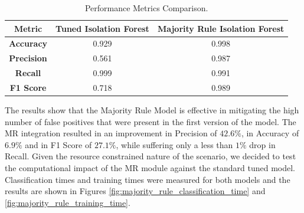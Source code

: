\documentclass[futureinternet,article,submit,pdftex,moreauthors]{Definitions/mdpi}
\begin{document}
\begin{table}[H]
    \caption{Performance Metrics Comparison.}\label{tab:majority_rule_performanceMetrics}
    \begin{tabularx}{\textwidth}{CCC}
    \toprule
    \textbf{Metric} & \textbf{Tuned Isolation Forest} & \textbf{Majority Rule Isolation Forest} \\
    \midrule
    \textbf{Accuracy}  & 0.929 & 0.998 \\
    \textbf{Precision} & 0.561 & 0.987 \\
    \textbf{Recall}    & 0.999 & 0.991 \\
    \textbf{F1 Score}  & 0.718 & 0.989 \\
    \bottomrule
    \end{tabularx}
\end{table}

The results show that the Majority Rule Model is effective in mitigating the high number of false positives that were present in the first version of the model. 
The MR integration resulted in an improvement in Precision of $42.6\%$, in Accuracy of $6.9\%$ and in F1 Score of $27.1\%$, while suffering only a less than $1\%$ drop in Recall.
Given the resource constrained nature of the scenario, we decided to test the computational impact of the MR module against the standard tuned model. 
Classification times and training times were measured for both models and the results are shown in Figures \ref{fig:majority_rule_classification_time} and \ref{fig:majority_rule_training_time}.
\end{document}

